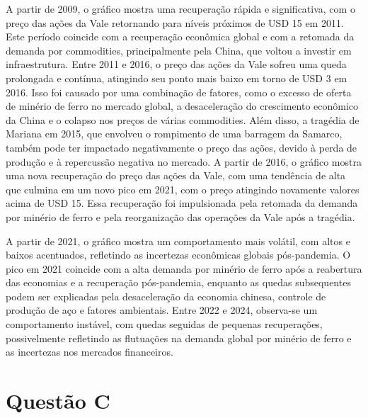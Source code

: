 \documentclass[a4paper,12pt]{article}[abntex2]
\begin{document}
A partir de 2009, o gráfico mostra uma recuperação rápida e significativa, com o preço das ações da Vale retornando para níveis próximos de USD 15 em 2011. Este período coincide com a recuperação econômica global e com a retomada da demanda por commodities, principalmente pela China, que voltou a investir em infraestrutura. Entre 2011 e 2016, o preço das ações da Vale sofreu uma queda prolongada e contínua, atingindo seu ponto mais baixo em torno de USD 3 em 2016. Isso foi causado por uma combinação de fatores, como o excesso de oferta de minério de ferro no mercado global, a desaceleração do crescimento econômico da China e o colapso nos preços de várias commodities. Além disso, a tragédia de Mariana em 2015, que envolveu o rompimento de uma barragem da Samarco, também pode ter impactado negativamente o preço das ações, devido à perda de produção e à repercussão negativa no mercado.
A partir de 2016, o gráfico mostra uma nova recuperação do preço das ações da Vale, com uma tendência de alta que culmina em um novo pico em 2021, com o preço atingindo novamente valores acima de USD 15. Essa recuperação foi impulsionada pela retomada da demanda por minério de ferro e pela reorganização das operações da Vale após a tragédia.

A partir de 2021, o gráfico mostra um comportamento mais volátil, com altos e baixos acentuados, refletindo as incertezas econômicas globais pós-pandemia. O pico em 2021 coincide com a alta demanda por minério de ferro após a reabertura das economias e a recuperação pós-pandemia, enquanto as quedas subsequentes podem ser explicadas pela desaceleração da economia chinesa, controle de produção de aço e fatores ambientais. Entre 2022 e 2024, observa-se um comportamento instável, com quedas seguidas de pequenas recuperações, possivelmente refletindo as flutuações na demanda global por minério de ferro e as incertezas nos mercados financeiros.

\section*{\textbf{Questão C}}
\end{document}
